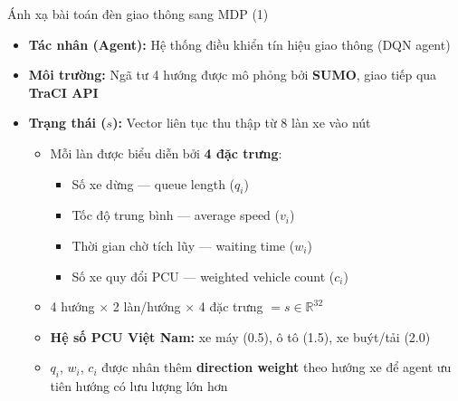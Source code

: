 \begin{frame}{Ánh xạ bài toán đèn giao thông sang MDP (1)}
\begin{itemize}
    \item \textbf{Tác nhân (Agent):} Hệ thống điều khiển tín hiệu giao thông (DQN agent)
    \item \textbf{Môi trường:} Ngã tư 4 hướng được mô phỏng bởi \textbf{SUMO}, giao tiếp qua \textbf{TraCI API}
    \item \textbf{Trạng thái ($s$):} Vector liên tục thu thập từ 8 làn xe vào nút
    \begin{itemize}
        \item Mỗi làn được biểu diễn bởi \textbf{4 đặc trưng}:
            \begin{itemize}
                \item Số xe dừng — queue length ($q_i$)
                \item Tốc độ trung bình — average speed ($v_i$)
                \item Thời gian chờ tích lũy — waiting time ($w_i$)
                \item Số xe quy đổi PCU — weighted vehicle count ($c_i$)
            \end{itemize}
        \item 4 hướng $\times$ 2 làn/hướng $\times$ 4 đặc trưng $= s \in \mathbb{R}^{32}$
        \item \textbf{Hệ số PCU Việt Nam:} xe máy (0.5), ô tô (1.5), xe buýt/tải (2.0)
        \item $q_i$, $w_i$, $c_i$ được nhân thêm \textbf{direction weight} theo hướng xe để agent ưu tiên hướng có lưu lượng lớn hơn
    \end{itemize}
\end{itemize}
\end{frame}

